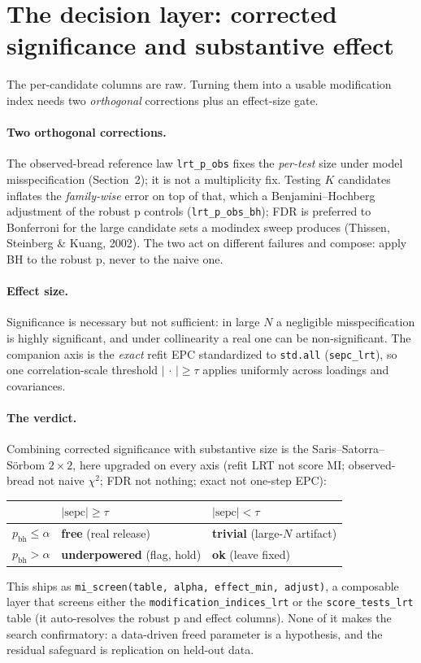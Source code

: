 \documentclass[11pt]{article}
\theoremstyle{plain}
\theoremstyle{remark}
\begin{document}
\section{The decision layer: corrected significance and substantive effect}

The per-candidate columns are raw. Turning them into a usable modification index
needs two \emph{orthogonal} corrections plus an effect-size gate.

\paragraph{Two orthogonal corrections.} The observed-bread reference law
\texttt{lrt\_p\_obs} fixes the \emph{per-test} size under model misspecification
(Section~2); it is not a multiplicity fix. Testing $K$ candidates inflates the
\emph{family-wise} error on top of that, which a Benjamini--Hochberg adjustment
of the robust p controls (\texttt{lrt\_p\_obs\_bh}); FDR is preferred to
Bonferroni for the large candidate sets a modindex sweep produces (Thissen,
Steinberg \& Kuang, 2002). The two act on different failures and compose: apply
BH to the robust p, never to the naive one.

\paragraph{Effect size.} Significance is necessary but not sufficient: in large
$N$ a negligible misspecification is highly significant, and under collinearity a
real one can be non-significant. The companion axis is the \emph{exact} refit EPC
standardized to \texttt{std.all} (\texttt{sepc\_lrt}), so one correlation-scale
threshold $|\,\cdot\,| \ge \tau$ applies uniformly across loadings and covariances.

\paragraph{The verdict.} Combining corrected significance with substantive size
is the Saris--Satorra--S\"orbom $2\times2$, here upgraded on every axis (refit LRT
not score MI; observed-bread not naive $\chi^2$; FDR not nothing; exact not
one-step EPC):
\begin{center}
\begin{tabular}{lll}
\toprule
 & $|\text{sepc}| \ge \tau$ & $|\text{sepc}| < \tau$ \\
\midrule
$p_{\text{bh}} \le \alpha$ & \textbf{free} (real release) & \textbf{trivial} (large-$N$ artifact) \\
$p_{\text{bh}} > \alpha$ & \textbf{underpowered} (flag, hold) & \textbf{ok} (leave fixed) \\
\bottomrule
\end{tabular}
\end{center}
This ships as \texttt{mi\_screen(table, alpha, effect\_min, adjust)}, a composable
layer that screens either the \texttt{modification\_indices\_lrt} or the
\texttt{score\_tests\_lrt} table (it auto-resolves the robust p and effect
columns). None of it makes the search confirmatory: a data-driven freed parameter
is a hypothesis, and the residual safeguard is replication on held-out data.
\end{document}
